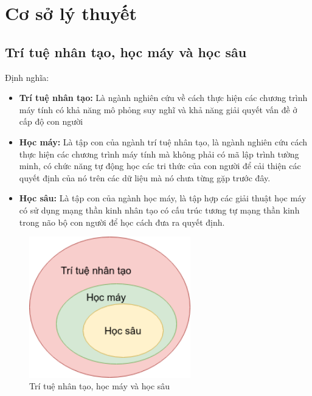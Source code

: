 \section{\texorpdfstring{Cơ sở lý thuyết}{base_knowledge}}

\subsection{\texorpdfstring{Trí tuệ nhân tạo, học máy và học sâu}{ai_ml_dl}}

Định nghĩa:
\begin{itemize}
    \item \textbf{Trí tuệ nhân tạo:} Là ngành nghiên cứu về cách thực hiện các chương trình máy tính có khả năng mô phỏng suy nghĩ và khả năng giải quyết vấn đề ở cấp độ con người
    \item \textbf{Học máy:} Là tập con của ngành trí tuệ nhân tạo, là ngành nghiên cứu cách thực hiện các chương trình máy tính mà không phải có mã lập trình tường minh, có chức năng tự động học các tri thức của con người để cải thiện các quyết định của nó trên các dữ liệu mà nó chưa từng gặp trước đây.
    \item \textbf{Học sâu:} Là tập con của ngành học máy, là tập hợp các giải thuật học máy có sử dụng mạng thần kinh nhân tạo có cấu trúc tương tự mạng thần kinh trong não bộ con người để học cách đưa ra quyết định.
\end{itemize}

\begin{figure}[H]
    \centering
    \includegraphics[width=7cm]{./content/materials/ai_ml_dl.png}
    \caption{Trí tuệ nhân tạo, học máy và học sâu}
\end{figure}



